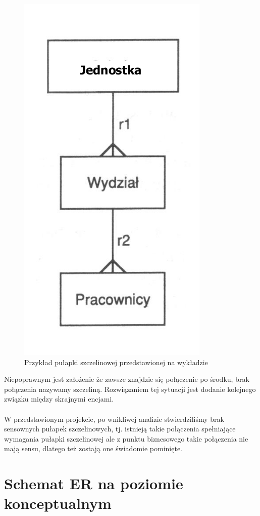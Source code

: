 \documentclass{mwrep}
\begin{document}
\begin{figure}[H]
	\centering
	\includegraphics[scale=0.4]{./szczelina.png}
	\caption{Przykład pułapki szczelinowej przedstawionej na wykładzie\cite{Kowalczyk1}}
\end{figure}

Niepoprawnym jest założenie że zawsze znajdzie się połączenie po środku, brak połączenia nazywamy szczeliną. Rozwiązaniem 
tej sytuacji jest dodanie kolejnego związku między skrajnymi encjami. \\
\\
W przedstawionym projekcie, po wnikliwej analizie stwierdziliśmy brak sensownych pułapek szczelinowych, tj. istnieją 
takie połączenia spełniające wymagania pułapki szczelinowej ale z punktu biznesowego takie połączenia nie mają sensu, dlatego też 
zostają one świadomie pominięte.	

\section{Schemat ER na poziomie konceptualnym}
\end{document}
